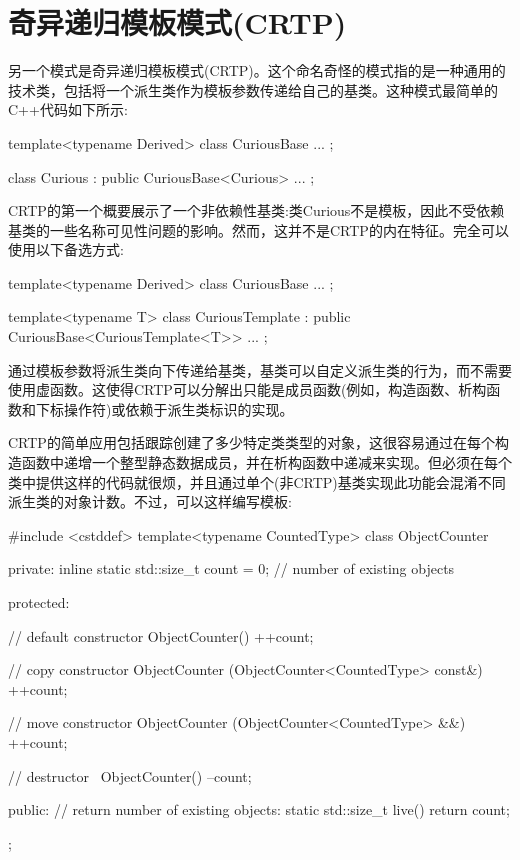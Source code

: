 \section{奇异递归模板模式(CRTP)}

另一个模式是奇异递归模板模式(CRTP)。这个命名奇怪的模式指的是一种通用的技术类，包括将一个派生类作为模板参数传递给自己的基类。这种模式最简单的C++代码如下所示:

\begin{cpp}
template<typename Derived>
class CuriousBase {
	...
};

class Curious : public CuriousBase<Curious> {
	...
};
\end{cpp}

CRTP的第一个概要展示了一个非依赖性基类:类Curious不是模板，因此不受依赖基类的一些名称可见性问题的影响。然而，这并不是CRTP的内在特征。完全可以使用以下备选方式:

\begin{cpp}
template<typename Derived>
class CuriousBase {
	...
};

template<typename T>
class CuriousTemplate : public CuriousBase<CuriousTemplate<T>> {
	...
};
\end{cpp}

通过模板参数将派生类向下传递给基类，基类可以自定义派生类的行为，而不需要使用虚函数。这使得CRTP可以分解出只能是成员函数(例如，构造函数、析构函数和下标操作符)或依赖于派生类标识的实现。

CRTP的简单应用包括跟踪创建了多少特定类类型的对象，这很容易通过在每个构造函数中递增一个整型静态数据成员，并在析构函数中递减来实现。但必须在每个类中提供这样的代码就很烦，并且通过单个(非CRTP)基类实现此功能会混淆不同派生类的对象计数。不过，可以这样编写模板:

\begin{cpp}
#include <cstddef>
template<typename CountedType>
class ObjectCounter {
private:
	inline static std::size_t count = 0; // number of existing objects

protected:
	
	// default constructor
	ObjectCounter() {
		++count;
	}

	// copy constructor
	ObjectCounter (ObjectCounter<CountedType> const&) {
		++count;
	}

	// move constructor
	ObjectCounter (ObjectCounter<CountedType> &&) {
		++count;
	}

	// destructor
	~ObjectCounter() {
		--count;
	}

public:
	// return number of existing objects:
	static std::size_t live() {
		return count;
	}
};
\end{cpp}

